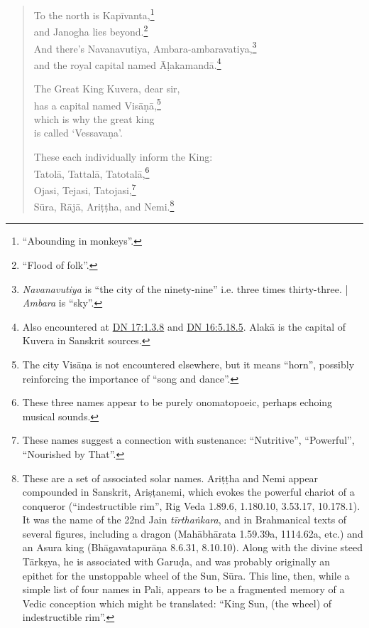 \documentclass[12pt,openany]{book}%
\begin{document}
\begin{verse}
To the north is \textsanskrit{Kapīvanta},\footnote{“Abounding in monkeys”. } \\
and Janogha lies beyond.\footnote{“Flood of folk”. } \\
And there’s Navanavutiya, Ambara-ambaravatiya,\footnote{\textit{Navanavutiya} is “the city of the ninety-nine” i.e. three times thirty-three. | \textit{Ambara} is “sky”. } \\
and the royal capital named \textsanskrit{Āḷakamandā}.\footnote{Also encountered at \href{https://suttacentral.net/dn17/en/sujato\#1.3.8}{DN 17:1.3.8} and \href{https://suttacentral.net/dn16/en/sujato\#5.18.5}{DN 16:5.18.5}. \textsanskrit{Alakā} is the capital of Kuvera in Sanskrit sources. } 

The Great King Kuvera, dear sir, \\
has a capital named \textsanskrit{Visāṇā},\footnote{The city \textsanskrit{Visāṇa} is not encountered elsewhere, but it means “horn”, possibly reinforcing the importance of “song and dance”. } \\
which is why the great king \\
is called ‘\textsanskrit{Vessavaṇa}’. 

These each individually inform the King: \\
\textsanskrit{Tatolā}, \textsanskrit{Tattalā}, \textsanskrit{Tatotalā},\footnote{These three names appear to be purely onomatopoeic, perhaps echoing musical sounds. } \\
Ojasi, Tejasi, Tatojasi,\footnote{These names suggest a connection with sustenance: “Nutritive”, “Powerful”, “Nourished by That”. } \\
\textsanskrit{Sūra}, \textsanskrit{Rājā}, \textsanskrit{Ariṭṭha}, and Nemi.\footnote{These are a set of associated solar names. \textsanskrit{Ariṭṭha} and Nemi appear compounded in Sanskrit, \textsanskrit{Ariṣṭanemi}, which evokes the powerful chariot of a conqueror (“indestructible rim”, Rig Veda 1.89.6, 1.180.10, 3.53.17, 10.178.1). It was the name of the 22nd Jain \textit{\textsanskrit{tīrthaṅkara}}, and in Brahmanical texts of several figures, including a dragon (\textsanskrit{Mahābhārata} 1.59.39a, 1114.62a, etc.) and an Asura king (\textsanskrit{Bhāgavatapurāṇa} 8.6.31, 8.10.10). Along with the divine steed \textsanskrit{Tārkṣya}, he is associated with \textsanskrit{Garuḍa}, and was probably originally an epithet for the unstoppable wheel of the Sun, \textsanskrit{Sūra}. This line, then, while a simple list of four names in Pali, appears to be a fragmented memory of a Vedic conception which might be translated: “King Sun, (the wheel) of indestructible rim”. } 


\end{verse}
\end{document}
